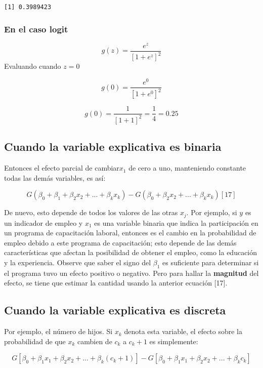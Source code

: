 \documentclass[
  letterpaper,
  DIV=11,
  numbers=noendperiod]{scrreprt}
\begin{document}
\begin{verbatim}
[1] 0.3989423
\end{verbatim}

\subsubsection{En el caso logit}\label{en-el-caso-logit}

\[g(z)=\frac{e^z}{[1+e^z]^2}\] Evaluando cuando \(z=0\)

\[g(0)=\frac{e^0}{[1+e^0]^2}\]

\[g(0)=\frac{1}{[1+1]^2}=\frac{1}{4}=0.25\]

\subsection{Cuando la variable explicativa es
binaria}\label{cuando-la-variable-explicativa-es-binaria}

Entonces el efecto parcial de cambiar\(x_1\) de cero a uno, manteniendo
constante todas las demás variables, es así:

\[G(\beta_0+\beta_1+\beta_2x_2+...+\beta_kx_k)-G(\beta_0+\beta_2x_2+...+\beta_kx_k) [17]\]

De nuevo, esto depende de todos los valores de las otras \(x_j\). Por
ejemplo, si \(y\) es un indicador de empleo y \(x_1\) es una variable
binaria que indica la participación en un programa de capacitación
laboral, entonces es el cambio en la probabilidad de empleo debido a
este programa de capacitación; esto depende de las demás características
que afectan la posibilidad de obtener el empleo, como la educación y la
experiencia. Observe que saber el signo del \(\beta_1\) es suficiente
para determinar si el programa tuvo un efecto positivo o negativo. Pero
para hallar la \textbf{magnitud} del efecto, se tiene que estimar la
cantidad usando la anterior ecuación {[}17{]}.

\subsection{Cuando la variable explicativa es
discreta}\label{cuando-la-variable-explicativa-es-discreta}

Por ejemplo, el número de hijos. Si \(x_k\) denota esta variable, el
efecto sobre la probabilidad de que \(x_k\) cambien de \(c_k\) a
\(c_k+1\) es simplemente:

\[G[\beta_0+\beta_1x_1+\beta_2x_2+...+\beta_k(c_k+1)]-G[\beta_0+\beta_1x_1+\beta_2x_2+...+\beta_kc_k]\]
\end{document}
